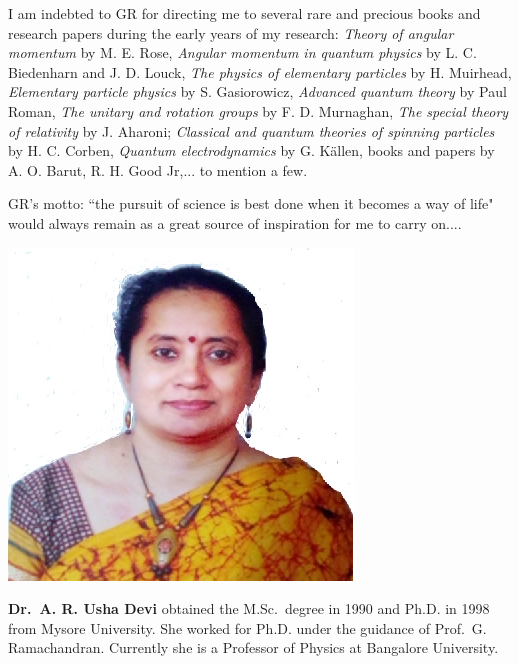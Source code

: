 I am indebted to GR for directing me to several rare and precious books and research papers during the early years of my research: \textit{Theory of angular momentum} by M. E. Rose, \textit{Angular momentum in quantum physics} by L. C. Biedenharn and J. D. Louck, \textit{The physics of elementary particles} by H. Muirhead, \textit{Elementary particle physics} by S. Gasiorowicz, \textit{Advanced quantum theory} by Paul Roman, \textit{The unitary and rotation groups} by F. D. Murnaghan, \textit{The special theory of relativity} by J. Aharoni; \textit{Classical and quantum theories of spinning particles} by H. C. Corben, \textit{Quantum electrodynamics} by G. K\"{a}llen, books and papers by A. O. Barut, R. H. Good Jr,... to mention a few.

GR's motto: ``the pursuit of science is best done when it becomes a way of life" would always remain as a great source of inspiration for me to carry on....
\vskip 1cm

\centerline{\includegraphics[scale=1]{authorsphotos/Prof_A_R_Usha_Devi.eps}}
\medskip

\noindent
\textbf{Dr.\ A. R. Usha Devi} obtained the M.Sc.\ degree in 1990 and Ph.D. in 1998 from Mysore University. She worked for Ph.D. under the guidance of Prof.\ G. Ramachandran. Currently she is a Professor of Physics at Bangalore University.
